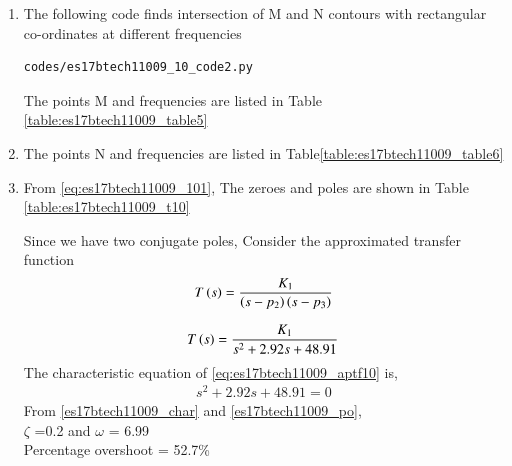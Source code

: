 \begin{enumerate}[label=\thesection.\arabic*.,ref=\thesection.\theenumi]
\begin{figure}[!h]
\caption{}
\label{fig:es17btech11009_10_1}
\end{figure}
\item
The following code finds intersection of M and N contours with rectangular co-ordinates at different frequencies
\begin{lstlisting}
codes/es17btech11009_10_code2.py
\end{lstlisting}
The points M and frequencies are listed in Table  \ref{table:es17btech11009_table5}
\begin{table}[!ht]
\centering

\caption{}
\label{table:es17btech11009_table5}
\end{table}
\item
The points N and frequencies are listed in Table\ref{table:es17btech11009_table6}
\begin{table}[!ht]
\centering

\caption{}
\label{table:es17btech11009_table6}
\end{table}
\item
From \eqref{eq:es17btech11009_101},
The zeroes and poles are shown in Table \ref{table:es17btech11009_t10}

\begin{table}[!ht]
\centering

\caption{}
\label{table:es17btech11009_t10}
\end{table}
Since we have two conjugate poles, Consider the approximated transfer function 
\begin{align}
T\left(s\right) = \frac{K_1}{\left(s-p_{2}\right)\left(s-p_{3}\right)}
\end{align}

\begin{align}
    T\brak{s}= \frac{K_1}{s^2 + 2.92s + 48.91}
    \label{eq:es17btech11009_aptf10}
\end{align}
The characteristic equation of \eqref{eq:es17btech11009_aptf10} is,
\begin{align}
s^2 + 2.92s + 48.91=0
 \end{align}
From \eqref{es17btech11009_char} and \eqref{es17btech11009_po},
\\
 $\zeta$ =0.2 and $\omega$ = 6.99
 \\
 Percentage overshoot = 52.7\%


\end{enumerate}
